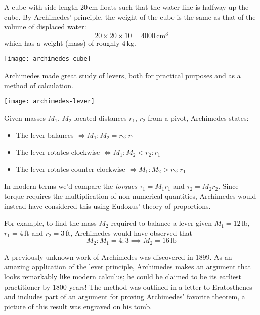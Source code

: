 \begin{minipage}[t]{0.69\linewidth}\vspace{0pt}
A cube with side length 20\,cm floats such that the water-line is halfway up the cube. By Archimedes' principle, the weight of the cube is the same as that of the volume of displaced water:
\[20\times 20\times 10=4000\,\text{cm}^3\]
which has a weight (mass) of roughly 4\,kg.
\end{minipage}\begin{minipage}[t]{0.3\linewidth}\vspace{0pt}
\flushright\texttt{[image: archimedes-cube]}
\end{minipage}



Archimedes made great study of levers, both for practical purposes and as a method of calculation.

\begin{center}
\texttt{[image: archimedes-lever]}
\end{center}

Given masses $M_1$, $M_2$ located distances $r_1$, $r_2$ from a pivot, Archimedes states:
\begin{itemize}%
  \item The lever balances $\iff M_1:M_2=r_2:r_1$
  \item The lever rotates clockwise $\iff M_1:M_2<r_2:r_1$
  \item The lever rotates counter-clockwise $\iff M_1:M_2>r_2:r_1$
\end{itemize}
In modern terms we'd compare the \emph{torques} $\tau_1=M_1r_1$ and $\tau_2=M_2r_2$. Since torque requires the multiplication of non-numerical quantities, Archimedes would instead have considered this using Eudoxus' theory of proportions.\par
For example, to find the mass $M_2$ required to balance a lever given $M_1=12$\,lb, $r_1=4$\,ft and $r_2=3$\,ft, Archimedes would have observed that
\[M_2:M_1=4:3\implies M_2=16\,\text{lb}\]
\goodbreak


A previously unknown work of Archimedes was discovered in 1899. As an amazing application of the lever principle, Archimedes makes an argument that looks remarkably like modern calculus; he could be claimed to be its earliest practitioner by 1800 years! The method was outlined in a letter to Eratosthenes and includes part of an argument for proving Archimedes' favorite theorem, a picture of this result was engraved on his tomb.

